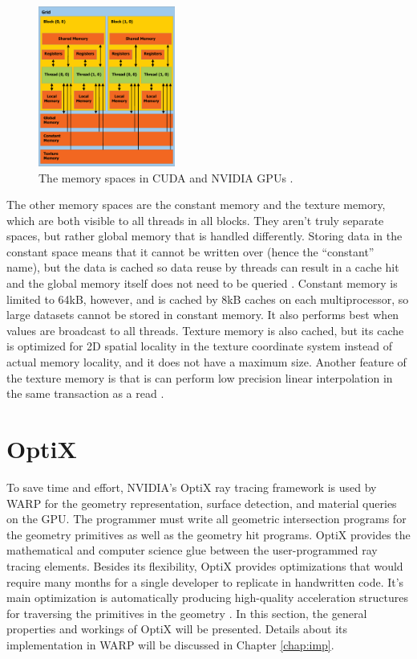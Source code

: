 \begin{figure}[h!] 
  \centering
    \includegraphics[width=0.4\textwidth]{graphics/CUDA_memory.eps}
     \caption[The memory spaces in CUDA and NVIDIA GPUs.]{The memory spaces in CUDA and NVIDIA GPUs \cite{cuda}. \label{cuda_mem}}
\end{figure} %

The other memory spaces are the constant memory and the texture memory, which are both visible to all threads in all blocks.  They aren't truly separate spaces, but rather global memory that is handled differently.  Storing data in the constant space means that it cannot be written over (hence the ``constant'' name), but the data is cached so data reuse by threads can result in a cache hit and the global memory itself does not need to be queried \cite{cuda}.  Constant memory is limited to 64kB, however, and is cached by 8kB caches on each multiprocessor, so large datasets cannot be stored in constant memory.  It also performs best when values are broadcast to all threads.  Texture memory is also cached, but its cache is optimized for 2D spatial locality in the texture coordinate system instead of actual memory locality, and it does not have a maximum size.  Another feature of the texture memory is that is can perform low precision linear interpolation in the same transaction as a read \cite{cuda}.

\section{OptiX}

To save time and effort, NVIDIA's OptiX ray tracing framework is used by WARP for the geometry representation, surface detection, and material queries on the GPU.  The programmer must write all geometric intersection programs for the geometry primitives as well as the geometry hit programs.  OptiX provides the mathematical and computer science glue between the user-programmed ray tracing elements.  Besides its flexibility, OptiX provides optimizations that would require many months for a single developer to replicate in handwritten code.  It's main optimization is automatically producing high-quality acceleration structures for traversing the primitives in the geometry \cite{optix}.  In this section, the general properties and workings of OptiX will be presented.  Details about its implementation in WARP will be discussed in Chapter \ref{chap:imp}.

